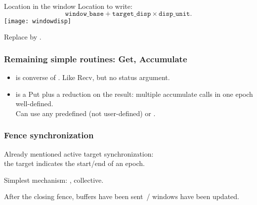 
\begin{frame}{Location in the window}
  Location to write:
  \[ \mathtt{window\_base} + \mathtt{target\_disp}\times \mathtt{disp\_unit}. \]
  \texttt{[image: windowdisp]}
\end{frame}

\begin{exerciseframe}[rightput]
  
\end{exerciseframe}

\begin{exerciseframe}[randomput]
  
\end{exerciseframe}

\begin{optexerciseframe}[randomput]
  Replace  by .
\end{optexerciseframe}

\begin{frame}[containsverbatim]\frametitle{Remaining simple routines:
    Get, Accumulate}
  \begin{itemize}
  \item {} is converse of . Like Recv, but no
    status argument.
  \item {} is a Put plus a reduction on the result:
    multiple accumulate calls in one epoch well-defined.\\
    Can use any predefined  (not user-defined) or .
  \end{itemize}
\end{frame}





\begin{frame}[containsverbatim]\frametitle{Fence synchronization}
  Already mentioned active target synchronization:\\
  the target indicates the start/end of an epoch.

  Simplest mechanism: , collective.  

  After the closing fence, buffers have been sent~/ windows have been updated.
\end{frame}

